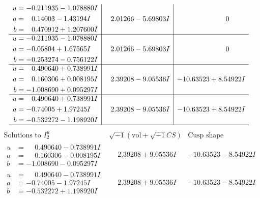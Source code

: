 \documentclass[1p]{elsarticle_modified}
\theoremstyle{definition}
\newcommand{\I}{\sqrt{-1}}
\begin{document}
$$\begin{array}{c|c|c}
\begin{aligned}
u &= -0.211935 - 1.078880 I \\
a &= \phantom{-}0.14003 - 1.43194 I \\
b &= \phantom{-}0.470912 + 1.207600 I\end{aligned}
 & \phantom{-}2.01266 - 5.69803 I & \phantom{-0.000000 } 0 \\ \hline\begin{aligned}
u &= -0.211935 - 1.078880 I \\
a &= -0.05804 + 1.67565 I \\
b &= -0.253274 - 0.756122 I\end{aligned}
 & \phantom{-}2.01266 - 5.69803 I & \phantom{-0.000000 } 0 \\ \hline\begin{aligned}
u &= \phantom{-}0.490640 + 0.738991 I \\
a &= \phantom{-}0.160306 + 0.008195 I \\
b &= -1.008690 + 0.095297 I\end{aligned}
 & \phantom{-}2.39208 - 9.05536 I & -10.63523 + 8.54922 I \\ \hline\begin{aligned}
u &= \phantom{-}0.490640 + 0.738991 I \\
a &= -0.74005 + 1.97245 I \\
b &= -0.532272 - 1.198920 I\end{aligned}
 & \phantom{-}2.39208 - 9.05536 I & -10.63523 + 8.54922 I\\
 \hline 
 \end{array}$$\newpage$$\begin{array}{c|c|c}  
\text{Solutions to }I^u_{2}& \I (\text{vol} + \sqrt{-1}CS) & \text{Cusp shape}\\
 \hline 
\begin{aligned}
u &= \phantom{-}0.490640 - 0.738991 I \\
a &= \phantom{-}0.160306 - 0.008195 I \\
b &= -1.008690 - 0.095297 I\end{aligned}
 & \phantom{-}2.39208 + 9.05536 I & -10.63523 - 8.54922 I \\ \hline\begin{aligned}
u &= \phantom{-}0.490640 - 0.738991 I \\
a &= -0.74005 - 1.97245 I \\
b &= -0.532272 + 1.198920 I\end{aligned}
 & \phantom{-}2.39208 + 9.05536 I & -10.63523 - 8.54922 I \\ \hline\begin{aligned}

\end{aligned}
\end{array}$$
\end{document}
